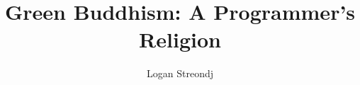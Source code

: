 \documentclass[10pt]{report}
\title{Green Buddhism: A Programmer's Religion}
\author{Logan Streondj \\
  \doclicenseName}
\begin{document}
\begin{titlepage}
\maketitle


\end{titlepage}
\end{document}
